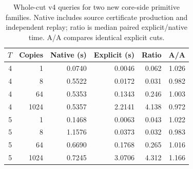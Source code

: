 \begin{table}[htbp]
\centering
\begin{tabular}{rrrrrr}
\toprule
$T$ & Copies & Native (s) & Explicit (s) & Ratio & A/A \\
\midrule
4 & 1 & 0.0740 & 0.0046 & 0.062 & 1.026 \\
4 & 8 & 0.5522 & 0.0172 & 0.031 & 0.982 \\
4 & 64 & 0.5353 & 0.1343 & 0.246 & 1.003 \\
4 & 1024 & 0.5357 & 2.2141 & 4.138 & 0.972 \\
5 & 1 & 0.1468 & 0.0063 & 0.043 & 1.022 \\
5 & 8 & 1.1576 & 0.0373 & 0.032 & 0.983 \\
5 & 64 & 0.6690 & 0.1768 & 0.265 & 1.016 \\
5 & 1024 & 0.7245 & 3.0706 & 4.312 & 1.166 \\
\bottomrule
\end{tabular}
\caption{Whole-cut v4 queries for two new core-side primitive families.
Native includes source certificate production and independent replay; ratio
is median paired explicit/native time. A/A compares identical explicit cuts.}
\label{marked-cut:core-annuli-timings}
\end{table}
